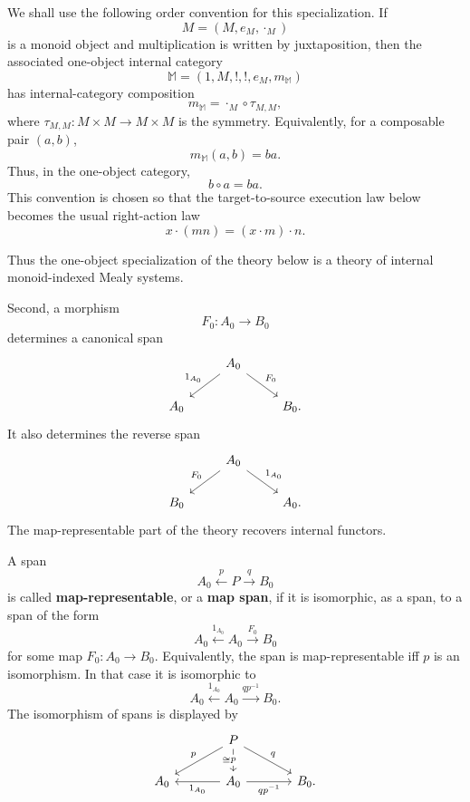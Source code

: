 We shall use the following order convention for this specialization. If
\[
    M=(M,e_M,\cdot_M)
\]
is a monoid object and multiplication is written by juxtaposition, then the associated one-object internal category
\[
    \mathbb M=(1,M,!,!,e_M,m_{\mathbb M})
\]
has internal-category composition
\[
    m_{\mathbb M}
    =
    \cdot_M\circ\tau_{M,M},
\]
where \(\tau_{M,M}:M\times M\to M\times M\) is the symmetry. Equivalently, for a composable pair \((a,b)\),
\[
    m_{\mathbb M}(a,b)=ba.
\]
Thus, in the one-object category,
\[
    b\circ a=ba.
\]
This convention is chosen so that the target-to-source execution law below becomes the usual right-action law
\[
    x\cdot(mn)=(x\cdot m)\cdot n.
\]

Thus the one-object specialization of the theory below is a theory of internal monoid-indexed Mealy systems.

Second, a morphism
\[
    F_0:A_0\to B_0
\]
determines a canonical span
\[
    \begin{tikzcd}
        & 
            A_0 
                \arrow[dl, "1_{A_0}"'] 
                \arrow[dr, "F_0"] 
        & 
        \\
            A_0 
        &
        & 
            B_0.
    \end{tikzcd}
\]
It also determines the reverse span
\[
    \begin{tikzcd}
        & 
            A_0 
                \arrow[dl, "F_0"'] 
                \arrow[dr, "1_{A_0}"] 
        & 
        \\
            B_0 
        &
        & 
            A_0.
    \end{tikzcd}
\]
The map-representable part of the theory recovers internal functors.

\begin{definition}
\label{def:representable-span}
    A span
    \[
        A_0\xleftarrow{p}P\xrightarrow{q}B_0
    \]
    is called \textbf{map-representable}, or a \textbf{map span}, if it is isomorphic, as a span, to a span of the form
    \[
        A_0
        \xleftarrow{1_{A_0}}
        A_0
        \xrightarrow{F_0}
        B_0
    \]
    for some map \(F_0:A_0\to B_0\). Equivalently, the span is map-representable iff \(p\) is an isomorphism. In that case it is isomorphic to
    \[
        A_0\xleftarrow{1_{A_0}}A_0\xrightarrow{q p^{-1}}B_0.
    \]
    The isomorphism of spans is displayed by
    \[
        \begin{tikzcd}[column sep=large]
            & 
                P 
                    \arrow[d, "p" description, "\cong"'] 
                    \arrow[dl, "p"'] 
                    \arrow[dr, "q"] 
            & 
            \\
                A_0 
            & 
                A_0 
                    \arrow[l, "1_{A_0}"] 
                    \arrow[r, "qp^{-1}"'] 
            & 
                B_0.
        \end{tikzcd}
    \]
\end{definition}

